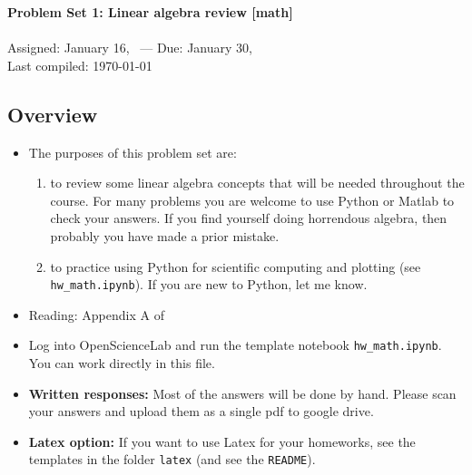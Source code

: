 \documentclass[11pt,titlepage,fleqn]{article}
\begin{document}

\begin{spacing}{1.2}
\centering
{\large \bf Problem Set 1: Linear algebra review [math]} \\
\cltag\ \\
Assigned: January 16, \cyear\ --- Due: January 30, \cyear\ \\
Last compiled: \today
\end{spacing}


\subsection*{Overview}

\begin{itemize}

\item The purposes of this problem set are:
%
\begin{enumerate}
\item  to review some linear algebra concepts that will be needed throughout the course.
For many problems you are welcome to use Python or Matlab to check your answers. If you find yourself doing horrendous algebra, then probably you have made a prior mistake.
\item to practice using Python for scientific computing and plotting (see \verb+hw_math.ipynb+).
If you are new to Python, let me know.
\end{enumerate}

\item Reading: Appendix A of \citet{Aster}

\item Log into OpenScienceLab and run the template notebook \verb+hw_math.ipynb+. You can work directly in this file.

\item {\bf Written responses:}
Most of the answers will be done by hand. Please scan your answers and upload them as a single pdf to google drive.

\item {\bf Latex option:}
If you want to use Latex for your homeworks, see the templates in the folder \verb+latex+ (and see the \verb+README+).

\end{itemize}
\end{document}
